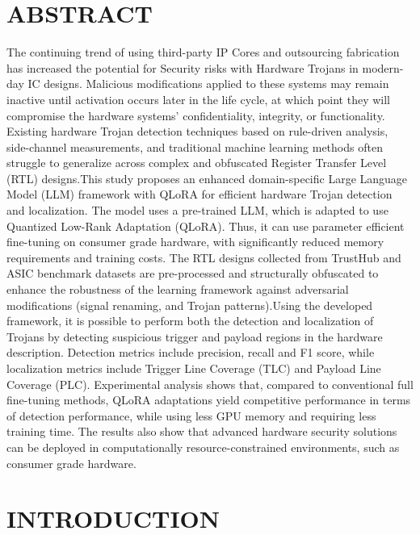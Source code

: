 \documentclass[12pt,a4paper]{report}
\begin{document}
\chapter*{ABSTRACT}

The continuing trend of using third-party IP Cores and outsourcing fabrication has increased the potential for Security risks with Hardware Trojans in modern-day IC designs. Malicious modifications applied to these systems may remain inactive until activation occurs later in the life cycle, at which point they will compromise the hardware systems’ confidentiality, integrity, or functionality. Existing hardware Trojan detection techniques based on rule-driven analysis, side-channel measurements, and traditional machine learning methods often struggle to generalize across complex and obfuscated Register Transfer Level (RTL) designs.This study proposes an enhanced domain-specific Large Language Model (LLM) framework with QLoRA for efficient hardware Trojan detection and localization. The model uses a pre-trained LLM, which is adapted to use Quantized Low-Rank Adaptation (QLoRA). Thus, it can use parameter efficient fine-tuning on consumer grade hardware, with significantly reduced memory requirements and training costs. The RTL designs collected from TrustHub and ASIC benchmark datasets are pre-processed and structurally obfuscated to enhance the robustness of the learning framework against adversarial modifications (signal renaming, and Trojan patterns).Using the developed framework, it is possible to perform both the detection and localization of Trojans by detecting suspicious trigger and payload regions in the hardware description. Detection metrics include precision, recall and F1 score, while localization metrics include Trigger Line Coverage (TLC) and Payload Line Coverage (PLC). Experimental analysis shows that, compared to conventional full fine-tuning methods, QLoRA adaptations yield competitive performance in terms of detection performance, while using less GPU memory and requiring less training time. The results also show that advanced hardware security solutions can be deployed in computationally resource-constrained environments, such as consumer grade hardware.

\newpage
{}

\tableofcontents

\newpage
{}


\chapter{INTRODUCTION}
\end{document}
